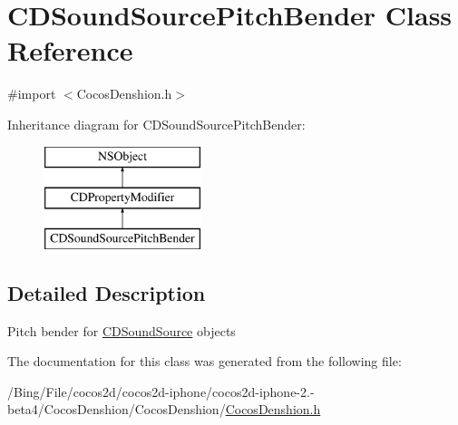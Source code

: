 \hypertarget{interface_c_d_sound_source_pitch_bender}{\section{C\-D\-Sound\-Source\-Pitch\-Bender Class Reference}
\label{interface_c_d_sound_source_pitch_bender}
}


{\ttfamily \#import $<$Cocos\-Denshion.\-h$>$}

Inheritance diagram for C\-D\-Sound\-Source\-Pitch\-Bender\-:\begin{figure}[H]
\begin{center}
\leavevmode
\includegraphics[height=3.000000cm]{interface_c_d_sound_source_pitch_bender}
\end{center}
\end{figure}


\subsection{Detailed Description}
Pitch bender for \hyperlink{interface_c_d_sound_source}{C\-D\-Sound\-Source} objects 

The documentation for this class was generated from the following file\-:\begin{DoxyCompactItemize}
\item 
/\-Bing/\-File/cocos2d/cocos2d-\/iphone/cocos2d-\/iphone-\/2.-\/beta4/\-Cocos\-Denshion/\-Cocos\-Denshion/\hyperlink{_cocos_denshion_8h}{Cocos\-Denshion.\-h}\end{DoxyCompactItemize}
